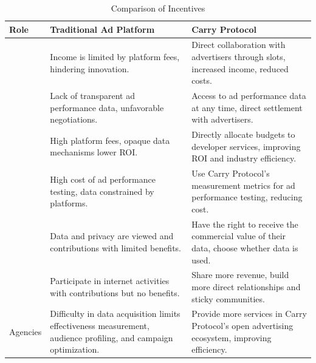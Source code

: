 \begin{table}[!htb]
    \centering
    \begin{tabular}{>{\raggedright\arraybackslash}p{2.5cm} p{6cm} p{6cm}}
        \toprule
        \textbf{Role} & \textbf{Traditional Ad Platform} & \textbf{Carry Protocol}  \\
        \midrule
        \multirow{2}{2.5cm}{Developers} 
        & Income is limited by platform fees, hindering innovation. 
        & Direct collaboration with advertisers through slots, increased income, reduced costs.  \\
        \cmidrule{2-3}
        & Lack of transparent ad performance data, unfavorable negotiations. 
        & Access to ad performance data at any time, direct settlement with advertisers. \\
        \midrule
        \multirow{2}{2.5cm}{Advertisers} 
        & High platform fees, opaque data mechanisms lower ROI. 
        & Directly allocate budgets to developer services, improving ROI and industry efficiency. \\
        \cmidrule{2-3}
        & High cost of ad performance testing, data constrained by platforms. 
        & Use Carry Protocol's measurement metrics for ad performance testing, reducing cost. \\
        \midrule
        \multirow{2}{2.5cm}{Users} 
        & Data and privacy are viewed and contributions with limited benefits. 
        & Have the right to receive the commercial value of their data, choose whether data is used. \\
        \cmidrule{2-3}
        & Participate in internet activities with contributions but no benefits. 
        & Share more revenue, build more direct relationships and sticky communities.\\
        \midrule
        Agencies 
        & Difficulty in data acquisition limits effectiveness measurement, audience profiling, and campaign optimization. 
        & Provide more services in Carry Protocol's open advertising ecosystem, improving efficiency.\\
        \bottomrule
    \end{tabular}
    \caption{Comparison of Incentives}
    \label{table:comparison}
\end{table}